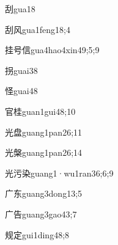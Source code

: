\begin{verbete}{刮}{gua1}{8}
\end{verbete}

\begin{verbete}{刮风}{gua1feng1}{8;4}
\end{verbete}

\begin{verbete}{挂号信}{gua4hao4xin4}{9;5;9}
\end{verbete}

\begin{verbete}{拐}{guai3}{8}
\end{verbete}

\begin{verbete}{怪}{guai4}{8}
\end{verbete}

\begin{verbete}{官桂}{guan1gui4}{8;10}
\end{verbete}

\begin{verbete}{光盘}{guang1pan2}{6;11}
\end{verbete}

\begin{verbete}{光槃}{guang1pan2}{6;14}
\end{verbete}

\begin{verbete}{光污染}{guang1·wu1ran3}{6;6;9}
\end{verbete}

\begin{verbete}{广东}{guang3dong1}{3;5}
\end{verbete}

\begin{verbete}{广告}{guang3gao4}{3;7}
\end{verbete}

\begin{verbete}{规定}{gui1ding4}{8;8}
\end{verbete}

